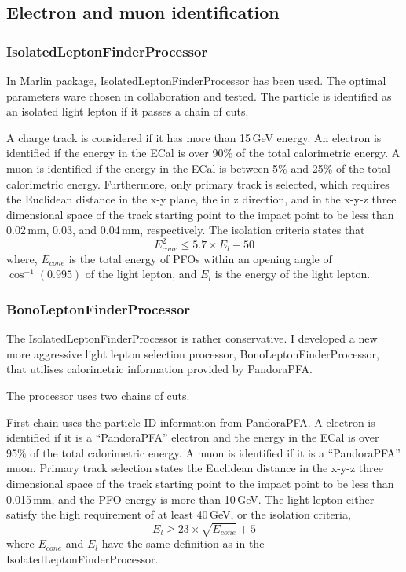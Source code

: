 \subsection{Electron and muon identification}
\label{sec:doubleHiggsLeptonID}


\subsubsection{IsolatedLeptonFinderProcessor}

In Marlin package, IsolatedLeptonFinderProcessor has been used. The optimal parameters ware chosen in collaboration and tested. The particle is identified as an isolated light lepton if it passes a chain of cuts.

A charge track is considered if it has more than 15\,GeV energy. An electron is identified if the energy in the ECal is over 90\% of the total calorimetric energy. A muon is identified if the energy in the ECal is between 5\% and 25\% of the total calorimetric energy. Furthermore, only primary track is selected, which requires the Euclidean distance in the x-y plane, the in z direction, and in the x-y-z three dimensional space of the track starting point to the impact point to be less than 0.02\,mm, 0.03\mm, and  0.04\,mm, respectively. The isolation criteria states that
\begin{equation}
E_{cone}^2 \leqslant 5.7 \times E_{l} - 50
\end{equation}
where, $E_{cone}$ is the total energy of PFOs within an opening angle of $\cos^{-1}(0.995)$ of the light lepton, and $E_{l}$ is the energy of the light lepton.

\subsubsection{BonoLeptonFinderProcessor}

The IsolatedLeptonFinderProcessor is rather conservative. I developed a new more aggressive light lepton selection processor, BonoLeptonFinderProcessor, that utilises calorimetric information provided by PandoraPFA.

The processor uses two chains of cuts.

First chain uses the particle ID information from PandoraPFA. A electron is identified if it is a ``PandoraPFA'' electron and the energy in the ECal is over 95\% of the total calorimetric energy. A muon is identified if it is a ``PandoraPFA'' muon.  Primary track selection states the Euclidean distance in the x-y-z three dimensional space of the track starting point to the impact point to be less than 0.015\,mm, and the PFO energy is more than 10\,GeV. The light lepton either satisfy the high \pT requirement of at least 40\,GeV, or the isolation criteria,
\begin{equation}
E_{l} \geqslant 23 \times \sqrt{E_{cone}} + 5
\end{equation}
where $E_{cone}$ and $E_{l}$ have the same definition as in the IsolatedLeptonFinderProcessor.

